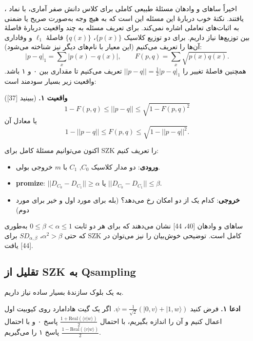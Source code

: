 اخیراً ساهای و وادهان مسئلهٔ طبیعی کاملی برای کلاس دانش صفر آماری، با نماد ، یافتند. نکتهٔ خوب دربارهٔ این مسئله این است که به هیچ وجه به‌صورت صریح یا ضمنی به اثبات‌های تعاملی اشاره نمی‌کند. برای تعریف مسئله به چند واقعیت دربارهٔ فاصلهٔ بین توزیع‌ها نیاز داریم. برای دو توزیع کلاسیک $\{p(x)\}$، $\{q(x)\}$ فاصلهٔ $\ell_1$ و وفاداری آن‌ها را تعریف می‌کنیم (این معیار با نام‌های دیگر نیز شناخته می‌شود):
\[
|p - q|_1 = \sum_x |p(x) - q(x)|, \qquad
F(p,q) = \sum_x \sqrt{p(x) q(x)}.
\]
همچنین فاصلهٔ تغییر را $||p - q|| = \frac{1}{2}|p - q|_1$ تعریف می‌کنیم تا مقداری بین ۰ و ۱ باشد. واقعیت زیر بسیار سودمند است:

\textbf{واقعیت ۱.} (ببینید [37])
\[
1 - F(p,q) \le ||p - q|| \le \sqrt{1 - F(p,q)^2}
\]
یا معادل آن
\[
1 - ||p - q|| \le F(p,q) \le \sqrt{1 - ||p - q||^2}.
\]

اکنون می‌توانیم مسئلهٔ کامل برای SZK را تعریف کنیم:
\begin{defn}
\noindent
\begin{itemize}
	\item 
	\textbf{ورودی}: دو مدار کلاسیک $C_0$, $C_1$ با $m$ خروجی بولی.
	\item
	\textbf{promize}: $||D_{C_0} - D_{C_1}|| \ge \alpha$ یا $||D_{C_0} - D_{C_1}|| \le \beta$.
	\item
	\textbf{خروجی}: کدام یک از دو امکان رخ می‌دهد؟ (بله برای مورد اول و خیر برای مورد دوم)
\end{itemize}
\end{defn}
ساهای و وادهان [40، 44] نشان می‌دهند که برای هر دو ثابت $0 \le \beta < \alpha \le 1$ به‌طوری که حتی $\alpha^2 > \beta$، $SD_{\alpha,\beta}$ برای SZK کامل است. توضیحی خوش‌بیان را نیز می‌توان در [44] یافت.

\subsection{ تقلیل از SZK به Qsampling}
به یک بلوک سازندهٔ بسیار ساده نیاز داریم.

\textbf{ادعا ۱.} فرض کنید $\psi = \frac{1}{\sqrt{2}}(|0,v\rangle + |1,w\rangle)$. اگر یک گیت هادامارد روی کیوبیت اول اعمال کنیم و آن را اندازه بگیریم، با احتمال $\frac{1 + \mathrm{Real}(\langle v|w\rangle)}{2}$ پاسخ ۰ و با احتمال $\frac{1 - \mathrm{Real}(\langle v|w\rangle)}{2}$ پاسخ ۱ را می‌گیریم.

